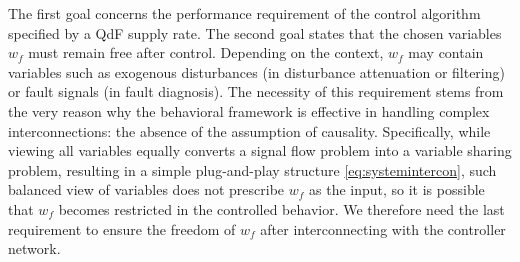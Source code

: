 \documentclass[11pt,print,draftcls,onecolumn,romanappendices]{ieeecolor}
\newtheorem{rem}{Remark}
\newcommand{\revise}[1]{{\color{black} #1}}
\newcommand{\Hk}{\mathcal{H}}
\begin{document}
The first goal concerns the performance requirement of the control algorithm specified by a QdF supply rate. The second goal states that the chosen variables $w_f$ must remain free after control. Depending on the context, $w_f$ may contain variables such as exogenous disturbances (in disturbance attenuation or filtering) or fault signals (in fault diagnosis). The necessity of this requirement stems from the very reason why the behavioral framework is effective in handling complex interconnections: the absence of the assumption of causality. Specifically, while viewing all variables equally converts a signal flow problem into a variable sharing problem, resulting in a simple plug-and-play structure \eqref{eq:systemintercon}, such balanced view of variables does not prescribe $w_f$ as the input, so it is possible that $w_f$ becomes restricted in the controlled behavior. We therefore need the last requirement to ensure the freedom of $w_f$ after interconnecting with the controller network.
\end{document}
